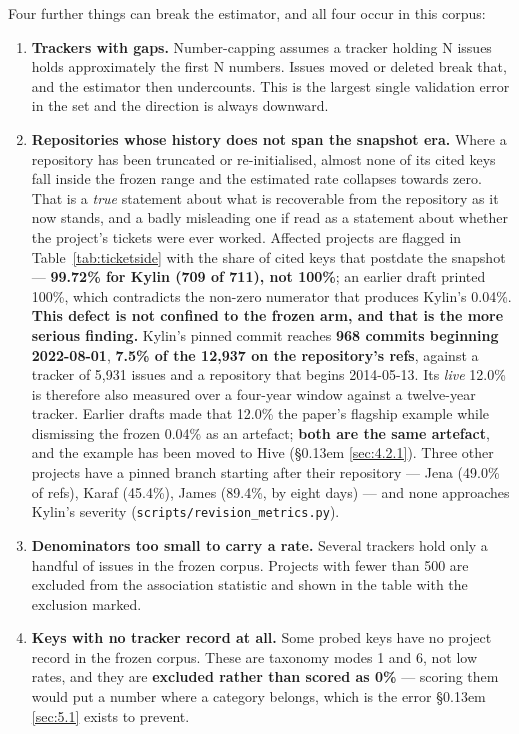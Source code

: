 \documentclass[conference]{IEEEtran}
\begin{document}
Four further things can break the estimator, and all four occur in this corpus:

\begin{enumerate}
\item \textbf{Trackers with gaps.} Number-capping assumes a tracker holding N issues holds approximately the first N numbers. Issues moved or deleted break that, and the estimator then undercounts. This is the largest single validation error in the set and the direction is always downward.
\item \textbf{Repositories whose history does not span the snapshot era.} Where a repository has been truncated or re-initialised, almost none of its cited keys fall inside the frozen range and the estimated rate collapses towards zero. That is a \emph{true} statement about what is recoverable from the repository as it now stands, and a badly misleading one if read as a statement about whether the project's tickets were ever worked. Affected projects are flagged in Table~\ref{tab:ticketside} with the share of cited keys that postdate the snapshot --- \textbf{99.72\% for Kylin (709 of 711), not 100\%}; an earlier draft printed 100\%, which contradicts the non-zero numerator that produces Kylin's 0.04\%.
\textbf{This defect is not confined to the frozen arm, and that is the more serious finding.} Kylin's pinned commit reaches \textbf{968 commits beginning 2022-08-01}, \textbf{7.5\% of the 12,937 on the repository's refs}, against a tracker of 5,931 issues and a repository that begins 2014-05-13. Its \emph{live} 12.0\% is therefore also measured over a four-year window against a twelve-year tracker. Earlier drafts made that 12.0\% the paper's flagship example while dismissing the frozen 0.04\% as an artefact; \textbf{both are the same artefact}, and the example has been moved to Hive (\S\kern0.13em \ref{sec:4.2.1}). Three other projects have a pinned branch starting after their repository --- Jena (49.0\% of refs), Karaf (45.4\%), James (89.4\%, by eight days) --- and none approaches Kylin's severity (\texttt{scripts/\allowbreak{}revision\_\allowbreak{}metrics.\allowbreak{}py}).

\item \textbf{Denominators too small to carry a rate.} Several trackers hold only a handful of issues in the frozen corpus. Projects with fewer than 500 are excluded from the association statistic and shown in the table with the exclusion marked.
\item \textbf{Keys with no tracker record at all.} Some probed keys have no project record in the frozen corpus. These are taxonomy modes 1 and 6, not low rates, and they are \textbf{excluded rather than scored as 0\%} --- scoring them would put a number where a category belongs, which is the error \S\kern0.13em \ref{sec:5.1} exists to prevent.
\end{enumerate}
\end{document}
